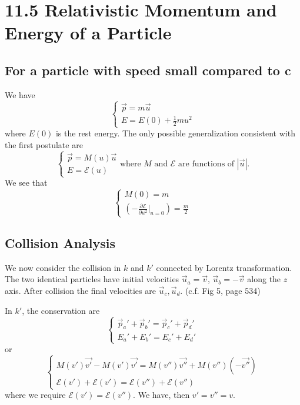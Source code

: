 \documentclass{article}
\begin{document}
	\section*{11.5 Relativistic Momentum and Energy of a Particle}
	
	\subsection*{For a particle with speed small compared to c}
	We have
	\[
	\begin{cases}
		\vec{p} = m\vec{u} \\
		E = E(0) + \frac{1}{2} m u^2
	\end{cases}
	\]
	where $E(0)$ is the rest energy.
	The only possible generalization consistent with the first postulate are
	\[
	\begin{cases}
		\vec{p} = M(u)\vec{u} \\
		E = \mathcal{E}(u)
	\end{cases}
	\text{where } M \text{ and } \mathcal{E} \text{ are functions of } |\vec{u}|.
	\]
	We see that
	\[
	\begin{cases}
		M(0) = m \\
		(-\frac{\partial \mathcal{E}}{\partial u^2}|_{u=0}) = \frac{m}{2}
	\end{cases}
	\]
	
	\subsection*{Collision Analysis}
	We now consider the collision in $k$ and $k'$ connected by Lorentz transformation.
	The two identical particles have initial velocities $\vec{u}_a = \vec{v}$, $\vec{u}_b = -\vec{v}$ along the $z$ axis. After collision the final velocities are $\vec{u}_c, \vec{u}_d$.
	(c.f. Fig 5, page 534)
	
	In $k'$, the conservation are
	\[
	\begin{cases}
		\vec{p}_a' + \vec{p}_b' = \vec{p}_c' + \vec{p}_d' \\
		E_a' + E_b' = E_c' + E_d'
	\end{cases}
	\]
	or
	\[
	\begin{cases}
		M(v')\vec{v'} - M(v')\vec{v'} = M(v'')\vec{v''} + M(v'')(-\vec{v''}) \\
		\mathcal{E}(v') + \mathcal{E}(v') = \mathcal{E}(v'') + \mathcal{E}(v'')
	\end{cases}
	\]
	where we require $\mathcal{E}(v') = \mathcal{E}(v'')$. We have, then $v' = v'' = v$.
	
\end{document}
